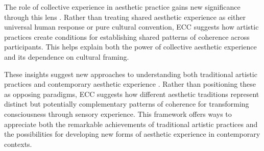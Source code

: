 The role of collective experience in aesthetic practice gains new significance through this lens \cite{schieffelin1976sorrow}. Rather than treating shared aesthetic experience as either universal human response or pure cultural convention, ECC suggests how artistic practices create conditions for establishing shared patterns of coherence across participants. This helps explain both the power of collective aesthetic experience and its dependence on cultural framing.

These insights suggest new approaches to understanding both traditional artistic practices and contemporary aesthetic experience \cite{coote1992anthropology}. Rather than positioning these as opposing paradigms, ECC suggests how different aesthetic traditions represent distinct but potentially complementary patterns of coherence for transforming consciousness through sensory experience. This framework offers ways to appreciate both the remarkable achievements of traditional artistic practices and the possibilities for developing new forms of aesthetic experience in contemporary contexts.